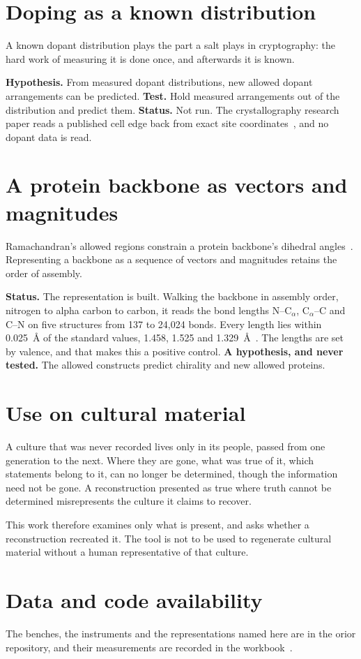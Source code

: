 \section{Doping as a known distribution}

A known dopant distribution plays the part a salt plays in cryptography: the hard work of measuring it
is done once, and afterwards it is known.

\textbf{Hypothesis.} From measured dopant distributions, new allowed dopant arrangements can be
predicted. \textbf{Test.} Hold measured arrangements out of the distribution and predict them.
\textbf{Status.} Not run. The crystallography research paper reads a published cell edge back from
exact site coordinates~\cite{src:Quigg-crystallography}, and no dopant data is read.

\section{A protein backbone as vectors and magnitudes}

Ramachandran's allowed regions constrain a protein backbone's dihedral
angles~\cite{src:Ramachandran-1963}. Representing a backbone as a sequence of vectors and magnitudes
retains the order of assembly.

\textbf{Status.} The representation is built. Walking the backbone in assembly order, nitrogen to
alpha carbon to carbon, it reads the bond lengths N--C\(_\alpha\), C\(_\alpha\)--C and C--N on five
structures from 137 to 24{,}024 bonds. Every length lies within 0.025~\AA{} of the standard values,
1.458, 1.525 and 1.329~\AA~\cite{src:Engh-Huber-1991,src:Quigg-orior-workbook}. The lengths are set by
valence, and that makes this a positive control. \textbf{A hypothesis, and never tested.} The allowed constructs predict
chirality and new allowed proteins.

\section{Use on cultural material}

A culture that was never recorded lives only in its people, passed from one generation to the next.
Where they are gone, what was true of it, which statements belong to it, can no longer be determined,
though the information need not be gone. A reconstruction presented as true where truth cannot be
determined misrepresents the culture it claims to recover.

This work therefore examines only what is present, and asks whether a reconstruction recreated it. The
tool is not to be used to regenerate cultural material without a human representative of that
culture.

\section{Data and code availability}

The benches, the instruments and the representations named here are in the orior repository, and their
measurements are recorded in the workbook~\cite{src:Quigg-orior-workbook}.
